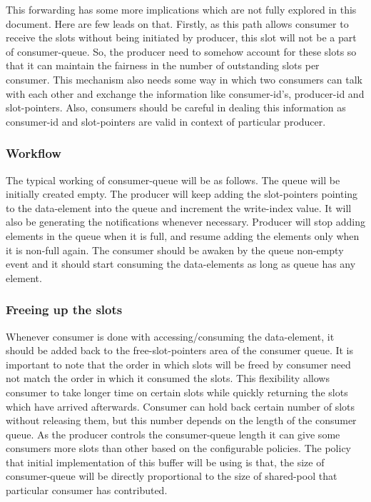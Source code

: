 \documentclass[a4paper,twoside]{report} %
\begin{document}
\begin{enumerate}
  This forwarding has some more implications which are not fully
  explored in this document.  Here are few leads on that.  Firstly,
  as this path allows consumer to receive the slots without being
  initiated by producer, this slot will not be a part of
  consumer-queue.  So, the producer need to somehow account for these
  slots so that it can maintain the fairness in the number of
  outstanding slots per consumer.  This mechanism also needs some way
  in which two consumers can talk with each other and exchange the 
  information like consumer-id's, producer-id and slot-pointers.
  Also, consumers should be careful in dealing this information as
  consumer-id and slot-pointers are valid in context of particular
  producer.



\end{enumerate} 

\subsubsection{Workflow}
The typical working of consumer-queue will be as follows.  The queue
will be initially created empty.  The producer will keep adding the
slot-pointers pointing to the data-element into the queue and
increment the write-index value.  It will also be generating the 
notifications whenever necessary.  Producer will stop
adding elements in the queue when it is full, and resume adding the
elements only when it is non-full again.  The consumer should be 
awaken by the queue non-empty event and it should start consuming 
the data-elements as long as queue has any element.  

\subsubsection{Freeing up the slots}
Whenever consumer is done with accessing/consuming the data-element,
it should be added back to the free-slot-pointers area of the consumer 
queue.  It is important to note that the order in which slots will be
freed by consumer need not match the order in which it consumed the
slots.  This flexibility allows consumer to take longer time on
certain slots while quickly returning the slots which have arrived
afterwards.  Consumer can hold back certain number of slots without
releasing them, but this number depends on the length of the consumer
queue.  As the producer controls the consumer-queue length it can give
some consumers more slots than other based on the configurable
policies.  The policy that initial implementation of this buffer will
be using is that, the size of consumer-queue will be directly
proportional to the size of shared-pool that particular consumer has
contributed.
\end{document}
